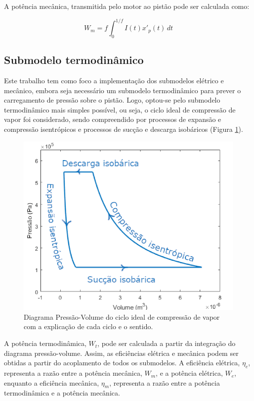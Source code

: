 A potência mecânica, transmitida pelo motor ao pistão pode ser calculada como:


\begin{equation}\label{eq:f_virt}
W_{m} = f \int_{0}^{1/f} I(t)x'_p(t) \,dt
\end{equation}

\subsection{Submodelo termodinâmico}

Este trabalho tem como foco a implementação dos submodelos elétrico e mecânico, embora seja necessário um submodelo termodinâmico para prever o carregamento de pressão sobre o pistão. Logo, optou-se pelo submodelo termodinâmico mais simples possível, ou seja, o ciclo ideal de compressão de vapor foi considerado, sendo compreendido por processos de expansão e compressão isentrópicos e processos de sucção e descarga isobáricos (Figura \ref{fig:grafico_pv}).


\begin{figure}[htb]
	\caption{\label{fig:grafico_pv}Diagrama Pressão-Volume do ciclo ideal de compressão de vapor com a explicação de cada ciclo e o sentido.}
	\begin{center}
		\includegraphics[scale=0.50]{images/termodinamico.png}
	\end{center}
\end{figure}

A potência termodinâmica, $W_t$, pode ser calculada a partir da integração do diagrama pressão-volume. Assim, as eficiências elétrica e mecânica podem ser obtidas a partir do acoplamento de todos os submodelos. A eficiência elétrica, $\eta_e$, representa a razão entre a potência mecânica, $W_m$, e a potência elétrica, $W_e$, enquanto a eficiência mecânica, $\eta_m$, representa a razão entre a potência termodinâmica e a potência mecânica.

